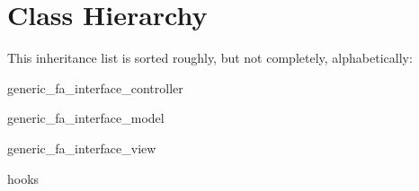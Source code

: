 \section{Class Hierarchy}
This inheritance list is sorted roughly, but not completely, alphabetically\+:\begin{DoxyCompactList}
\item generic\+\_\+fa\+\_\+interface\+\_\+controller\begin{DoxyCompactList}
\item {}
\end{DoxyCompactList}
\item generic\+\_\+fa\+\_\+interface\+\_\+model\begin{DoxyCompactList}
\item {}
\end{DoxyCompactList}
\item generic\+\_\+fa\+\_\+interface\+\_\+view\begin{DoxyCompactList}
\item {}
\end{DoxyCompactList}
\item hooks\begin{DoxyCompactList}
\item {}
\end{DoxyCompactList}
\end{DoxyCompactList}
